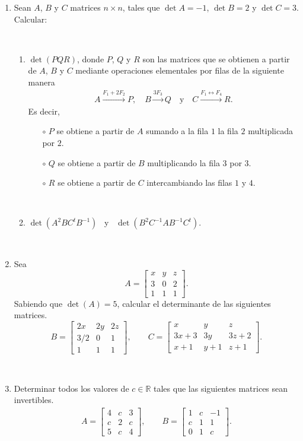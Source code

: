 \documentclass[a4paper,12pt,twoside,spanish,reqno]{amsbook}
\numberwithin{equation}{section}
\begin{document}
\begin{enumerate}
\

\item Sean $A$, $B$ y $C$ matrices $n\times n$, tales que $\det A=-1$, $\det B=2$ y $\det C=3$.
Calcular:

\

\begin{enumerate}
\item $\det(PQR)$, donde $P$, $Q$ y $R$ son las matrices que se obtienen a partir de $A$, $B$ y $C$ mediante operaciones elementales por filas de la siguiente manera
 \begin{align*}
 A\overset{F_1+2F_2}{\longrightarrow} P,\quad
 B\overset{3F_3}{\longrightarrow} Q
 \quad\mbox{y}\quad
 C\overset{F_1\leftrightarrow F_4}{\longrightarrow} R.
 \end{align*}
 Es decir,
 \begin{itemize}
  \item[$\circ$] $P$ se obtiene a partir de $A$ sumando a la fila $1$ la fila $2$ multiplicada por $2$.
  \item[$\circ$] $Q$ se obtiene a partir de $B$ multiplicando la fila $3$ por $3$.
  \item[$\circ$] $R$ se obtiene a partir de $C$ intercambiando las filas $1$ y $4$.
 \end{itemize}

\

\item $\det(A^2BC^tB^{-1})$ \ y \ $\det(B^2C^{-1}AB^{-1}C^{t})$.

\end{enumerate}


\

\item  Sea
$$A=
\begin{bmatrix}
	x&y&z \\
	3&0&2\\
	1&1&1
\end{bmatrix}.$$
Sabiendo que $\det(A) = 5$, calcular el determinante de las siguientes matrices.
$$
B = \begin{bmatrix}
2x&2y&2z \\
3/2&0&1\\
1&1&1
\end{bmatrix}, \qquad
C=
\begin{bmatrix}
	x&y&z \\
	3x+3&3y&3z+2\\
	x+1&y+1&z+1
\end{bmatrix}.
$$

\

\item Determinar todos los valores de $c\in\mathbb{R}$ tales que las siguientes matrices sean invertibles.
\begin{align*}
A=\begin{bmatrix}4& c&3\\c&2&c\\ 5&c&4 \end{bmatrix},\qquad
B=\begin{bmatrix} 1&c&-1\\ c&1&1\\0&1&c\end{bmatrix}.
\end{align*}



\end{enumerate}
\end{document}
